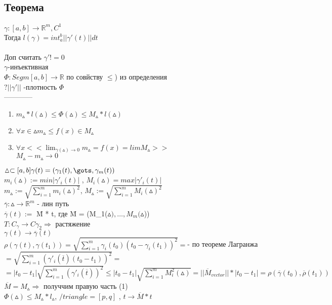 \documentclass[12pt, a4paper]{article}
\begin{document}
{ \subsection{Теорема}
    $\gamma : [a,b] \rightarrow \mathbb{R}^m, C^1$\\
    Тогда $l(\gamma)=int_{a}^{b}||\gamma'(t)|| dt $\\
 \\
    Доп считать $\gamma' != 0 $\\
    $\gamma$-инъективная\\
    $\Phi: Segm[a,b] \rightarrow \mathbb{R}$ по совйству $\leq$) из    определения\\
     $?||\gamma'||$ -плотность $\Phi$\\
     ------------\\
  \begin{enumerate}
    \item   
        $m_{\vartriangle}*l(\vartriangle) \leq \Phi(\vartriangle)\leq     M_\vartriangle*l(\vartriangle)$ \\
    \item
        $\forall x \in \vartriangle  m_\vartriangle \leq f(x) \in M_\vartriangle$ \\
    \item
        $\forall x  << \lim_{\gamma(\vartriangle)\rightarrow 0}  m_\vartriangle =f(x) = lim M_\vartriangle >>$ \\
        $M_\vartriangle -m_\vartriangle \rightarrow 0$ \\
  \end{enumerate}
  $\vartriangle \subset [a,b] \gamma(t)=(\gamma_1(t),\gots,\gamma_m(t))$\\
  $m_i(\vartriangle):= min|\gamma'_i(t)|$ ,   $M_i(\vartriangle)=max|\gamma'_i(t)|$\\
  $m_\vartriangle := \sqrt{\sum_{i=1}^m m_i(\vartriangle)^2}$,   
  $M_\vartriangle:=\sqrt{\sum_{i=1}^m M_i(\vartriangle)^2} $\\
  $ \overline\gamma : \vartriangle \rightarrow \mathbb{R}^m$ - лин путь \\
  $\overline\gamma(t):=$ \=M * t, где \=M = (M_1($\vartriangle),\dots,M_m(\vartriangle$)) \\
  $T:C_\gamma \rightarrow C \gamma_2 \Rightarrow$ растяжение \\
  $\gamma(t) \rightarrow \overline\gamma(t)$ \\
  $\rho(\gamma(t),\gamma(t_1))=\sqrt{\sum_{i=1}^{m}\gamma_i({ t_0})(t_0-\gamma_i(t_1))^2}=$- по теореме Лагранжа\\
  $=\sqrt{\sum_{i=1}^{m}(\gamma'_i(\overline t)(t_0 - t_1))^2} = $
  $=|t_0 -t_1|\sqrt{\sum_{i=1}^{m}(\gamma'_i(\overline t))^2} \leq |t_0 - t_1| \sqrt{\sum_{i=1}^{m}M_{i}^2(\vartriangle)} = ||\overline M_{vector}||*|t_0 - t_1| = \rho(\overline \gamma(t_0),\overline\rho(t_1))$\\
  $\overline M = M_{\vartriangle} \Rightarrow$ получчим правую часть (1)\\
  $\Phi(\vartriangle)\leq M_\vartriangle * l_\vartriangle$,   $/triangle =[p,q]$ ,   $t \rightarrow \overline M*t$ \\

}
\end{document}
